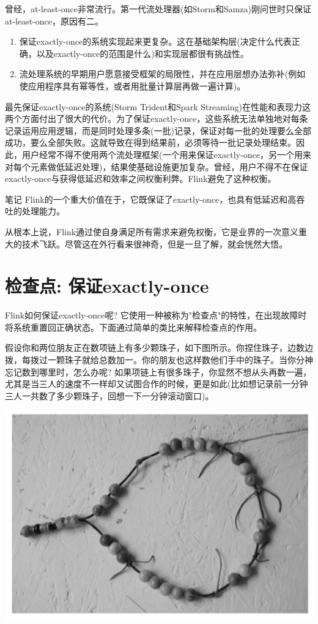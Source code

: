 \documentclass[oneside]{ctexbook}
\begin{document}
曾经，at-least-once非常流行。第一代流处理器(如Storm和Samza)刚问世时只保证at-least-once，原因有二。

\begin{enumerate}
\item 保证exactly-once的系统实现起来更复杂。这在基础架构层(决定什么代表正确，以及exactly-once的范围是什么)和实现层都很有挑战性。
\item 流处理系统的早期用户愿意接受框架的局限性，并在应用层想办法弥补(例如使应用程序具有幂等性，或者用批量计算层再做一遍计算)。
\end{enumerate}
最先保证exactly-once的系统(Storm Trident和Spark Streaming)在性能和表现力这两个方面付出了很大的代价。为了保证exactly-once，这些系统无法单独地对每条记录运用应用逻辑，而是同时处理多条(一批)记录，保证对每一批的处理要么全部成功，要么全部失败。这就导致在得到结果前，必须等待一批记录处理结束。因此，用户经常不得不使用两个流处理框架(一个用来保证exactly-once，另一个用来对每个元素做低延迟处理)，结果使基础设施更加复杂。曾经，用户不得不在保证exactly-once与获得低延迟和效率之间权衡利弊。Flink避免了这种权衡。

\begin{bclogo}[logo=\bcinfo, couleurBarre=orange, noborder=true, couleur=white]{笔记}
Flink的一个重大价值在于，它既保证了exactly-once，也具有低延迟和高吞吐的处理能力。
\end{bclogo}

从根本上说，Flink通过使自身满足所有需求来避免权衡，它是业界的一次意义重大的技术飞跃。尽管这在外行看来很神奇，但是一旦了解，就会恍然大悟。

\section{检查点: 保证exactly-once}

Flink如何保证exactly-once呢? 它使用一种被称为"检查点"的特性，在出现故障时将系统重置回正确状态。下面通过简单的类比来解释检查点的作用。

假设你和两位朋友正在数项链上有多少颗珠子，如下图所示。你捏住珠子，边数边拨，每拨过一颗珠子就给总数加一。你的朋友也这样数他们手中的珠子。当你分神忘记数到哪里时，怎么办呢? 如果项链上有很多珠子，你显然不想从头再数一遍，尤其是当三人的速度不一样却又试图合作的时候，更是如此(比如想记录前一分钟三人一共数了多少颗珠子，回想一下一分钟滚动窗口)。

\noindent \includegraphics[width=\textwidth]{balls.png}
\end{document}
